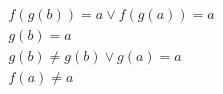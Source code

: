 \begin{align*}
%
& f(g(b)) = a \lor f(g(a)) = a
~\\~
& g(b) = a
~\\~
& g(b)  \neq  g(b) \lor g(a) = a
~\\~
& f(a)  \neq  a
%
\end{align*}
